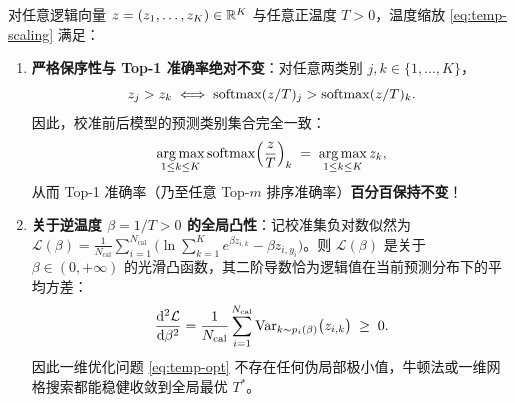 \begin{thmBox}
\begin{theorem}[温度缩放的保序准确率不变性与逆温度凸性]\label{thm:temp-scaling}
对任意逻辑向量 $z = (z_1,\dots,z_K) \in \mathbb{R}^K$ 与任意正温度 $T > 0$，温度缩放 \eqref{eq:temp-scaling} 满足：
\begin{enumerate}
  \item \textbf{严格保序性与 Top-1 准确率绝对不变}：对任意两类别 $j, k \in \{1,\dots,K\}$，
  \begin{equation}\label{eq:order-preserving}
    z_j > z_k \;\Longleftrightarrow\; \operatorname{softmax}(z/T)_j > \operatorname{softmax}(z/T)_k.
  \end{equation}
  因此，校准前后模型的预测类别集合完全一致：
  \[
    \operatorname*{arg\,max}_{1\le k\le K} \operatorname{softmax}\!\left(\frac{z}{T}\right)_k \;=\; \operatorname*{arg\,max}_{1\le k\le K} z_k,
  \]
  从而 Top-1 准确率（乃至任意 Top-$m$ 排序准确率）\textbf{百分百保持不变}！
  \item \textbf{关于逆温度 $\beta = 1/T > 0$ 的全局凸性}：记校准集负对数似然为 $\mathcal{L}(\beta) = \frac{1}{N_{\text{cal}}}\sum_{i=1}^{N_{\text{cal}}}\big(\ln\sum_{k=1}^K e^{\beta z_{i,k}} - \beta z_{i,y_i}\big)$。则 $\mathcal{L}(\beta)$ 是关于 $\beta \in (0, +\infty)$ 的光滑凸函数，其二阶导数恰为逻辑值在当前预测分布下的平均方差：
  \begin{equation}\label{eq:temp-convex}
    \frac{\mathrm{d}^2 \mathcal{L}}{\mathrm{d}\beta^2}
    = \frac{1}{N_{\text{cal}}} \sum_{i=1}^{N_{\text{cal}}} \operatorname{Var}_{k \sim p_i(\beta)}\!\big(z_{i,k}\big) \;\ge\; 0.
  \end{equation}
  因此一维优化问题 \eqref{eq:temp-opt} 不存在任何伪局部极小值，牛顿法或一维网格搜索都能稳健收敛到全局最优 $T^*$。
\end{enumerate}
\end{theorem}
\end{thmBox}


